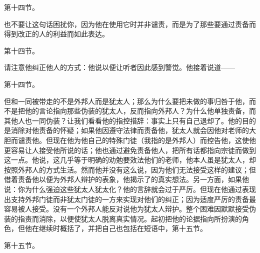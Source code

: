 第十四节。\par

也不要让这句话困扰你，因为他在使用它时并非谴责，而是为了那些要通过责备而得到改正的人的利益而如此表达。\par

第十四节。\par

请注意他纠正他人的方式：他说以便让听者因此感到警觉。他接着说道——\par

第十四节。\par

但和一同被带走的不是外邦人而是犹太人；那么为什么要把未做的事归咎于他，而不是把他的言论指向那些伪装的犹太人，反而指向外邦人？为什么他单独责备，而其他人也一同伪装？让我们看看他的指控措辞：事实上只有自己退却了。他的目的是消除对他责备的怀疑；如果他因遵守法律而责备他，犹太人就会因他对老师的大胆而谴责他。但现在他为他自己的特殊门徒（我指的是外邦人）而控告他，这使他更容易让人接受他所说的话；他也通过避免责备他人，把所有话都指向宗徒而做到这一点。他说，这几乎等于明确的劝勉要效法他们的老师，他本人虽是犹太人，却按照外邦人的方式生活。然而他并没有这么说，因为他们无法接受这样的建议；但借着责备他以便为外邦人辩护的表象，他揭示了的真实想法。另一方面，如果他说：你为什么强迫这些犹太人犹太化？他的言辞就会过于严厉。但现在他通过表现出支持外邦门徒而非犹太门徒的一方来实现对他们的纠正；因为适度严厉的责备最容易被人接受。没有一个外邦人能反对说他为犹太人辩护。整个困难因默默接受伪装的指责而消除，以便使犹太人脱离真实情况。起初把他的论据指向所扮演的角色，但他在继续时概括了，并把自己也包括在短语中，\newline{}第十五节。\par

第十五节。\par

